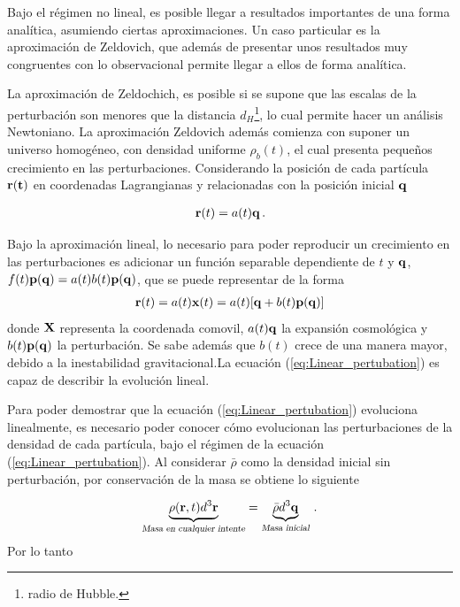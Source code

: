 Bajo el régimen no lineal, es posible llegar a resultados importantes de una forma analítica, asumiendo ciertas aproximaciones. Un caso particular es la aproximación de Zeldovich, que además de presentar unos resultados muy congruentes con lo observacional permite llegar a ellos de forma analítica. 

La aproximación de Zeldochich, es posible si se supone que las escalas de la perturbación son menores que la distancia $d_{H}$\footnote{radio de Hubble.}, lo cual permite hacer un análisis Newtoniano. La aproximación Zeldovich además comienza con suponer un universo homogéneo, con densidad uniforme $\rho_{b}(t)$, el  cual presenta pequeños crecimiento en las perturbaciones. Considerando la posición de cada partícula $\bf{r}(t)$ en coordenadas Lagrangianas y relacionadas con la posición inicial $\bf{q}$

\begin{align}
{\bf{r}}(t)=a(t){\bf{q}}\,.
\end{align}

Bajo la aproximación lineal, lo necesario para poder reproducir un crecimiento en las perturbaciones es adicionar un función separable dependiente de $t$ y $\bf{q}$, $f(t){\bf{p}}({\bf{q}})=a(t)b(t){\bf{p}(\bf{q})}$, que se puede representar de la forma 
%
\begin{align}
{\bf{r}}(t)=a(t){\bf{x}}(t)=a(t)[{\bf{q}}+b(t){\bf{p(q)}}]
\label{eq:Linear_pertubation}
\end{align}
%
donde ${\bf{X}}$ representa la coordenada comovil, $a(t){\bf{q}}$  la expansión cosmológica y $b(t){\bf{p(q)}}$ la perturbación. Se sabe además que $b(t)$ crece de una manera mayor, debido a la inestabilidad gravitacional.La ecuación (\ref{eq:Linear_pertubation}) es capaz de describir la evolución lineal.

Para poder demostrar que la ecuación (\ref{eq:Linear_pertubation})  evoluciona linealmente, es necesario poder conocer cómo evolucionan las perturbaciones de la densidad de cada partícula, bajo el régimen de la ecuación (\ref{eq:Linear_pertubation}). Al considerar $\bar{\rho}$ como la densidad inicial sin perturbación, por conservación de la masa se obtiene lo siguiente

\begin{align}
\underbrace{\rho({\bf{r}},t)d^{3}{\bf{r}}}_{{\textsl{Masa\ en\ cualquier\ intente}}} = \underbrace{\bar{\rho}d^{3}{\bf{q}}}_{{\textsl{Masa\  inicial}}} \,.
\end{align}
%
Por lo tanto

